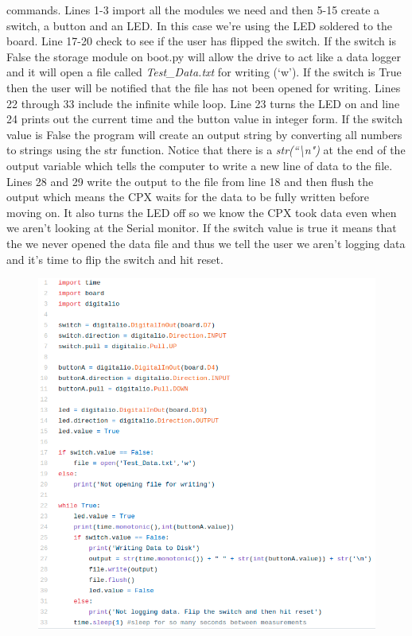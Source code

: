 commands. Lines 1-3 import all the modules we need and then 5-15
create a switch, a button and an LED. In this case we’re using the LED
soldered to the board. Line 17-20 check to see if the user has flipped
the switch. If the switch is False the storage module on boot.py will
allow the drive to act like a data logger and it will open a file
called {\it Test\_Data.txt} for writing (‘w’). If the switch is True then the
user will be notified that the file has not been opened for
writing. Lines 22 through 33 include the infinite while loop. Line 23
turns the LED on and line 24 prints out the current time and the
button value in integer form. If the switch value is False the program
will create an output string by converting all numbers to strings
using the str function. Notice that there is a {\it
  str(``\textbackslash n")} at the end of
the output variable which tells the computer to write a new line of
data to the file. Lines 28 and 29 write the output to the file from
line 18 and then flush the output which means the CPX waits for the
data to be fully written before moving on. It also turns the LED off
so we know the CPX took data even when we aren’t looking at the Serial
monitor. If the switch value is true it means that the we never opened
the data file and thus we tell the user we aren’t logging data and
it’s time to flip the switch and hit reset. 
\begin{figure}[H]
  \begin{center}
    \includegraphics[width=\textwidth]{Figures/method3_1.png}
  \end{center}
\end{figure}
